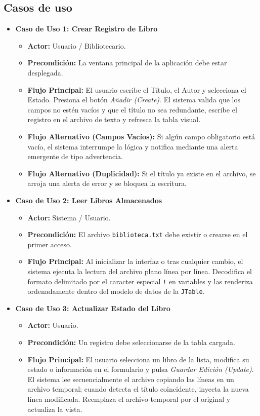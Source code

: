 \documentclass[a4paper]{article} %
\begin{document}
\subsection{Casos de uso}
\begin{itemize}
    \item \textbf{Caso de Uso 1: Crear Registro de Libro}
    \begin{itemize}
        \item \textbf{Actor:} Usuario / Bibliotecario.
        \item \textbf{Precondición:} La ventana principal de la aplicación debe estar desplegada.
        \item \textbf{Flujo Principal:} El usuario escribe el Título, el Autor y selecciona el Estado. Presiona el botón \textit{Añadir (Create)}. El sistema valida que los campos no estén vacíos y que el título no sea redundante, escribe el registro en el archivo de texto y refresca la tabla visual.
        \item \textbf{Flujo Alternativo (Campos Vacíos):} Si algún campo obligatorio está vacío, el sistema interrumpe la lógica y notifica mediante una alerta emergente de tipo advertencia.
        \item \textbf{Flujo Alternativo (Duplicidad):} Si el título ya existe en el archivo, se arroja una alerta de error y se bloquea la escritura.
    \end{itemize}
    
    \item \textbf{Caso de Uso 2: Leer Libros Almacenados}
    \begin{itemize}
        \item \textbf{Actor:} Sistema / Usuario.
        \item \textbf{Precondición:} El archivo \texttt{biblioteca.txt} debe existir o crearse en el primer acceso.
        \item \textbf{Flujo Principal:} Al inicializar la interfaz o tras cualquier cambio, el sistema ejecuta la lectura del archivo plano línea por línea. Decodifica el formato delimitado por el caracter especial \texttt{!} en variables y las renderiza ordenadamente dentro del modelo de datos de la \texttt{JTable}.
    \end{itemize}

    \item \textbf{Caso de Uso 3: Actualizar Estado del Libro}
    \begin{itemize}
        \item \textbf{Actor:} Usuario.
        \item \textbf{Precondición:} Un registro debe seleccionarse de la tabla cargada.
        \item \textbf{Flujo Principal:} El usuario selecciona un libro de la lista, modifica su estado o información en el formulario y pulsa \textit{Guardar Edición (Update)}. El sistema lee secuencialmente el archivo copiando las líneas en un archivo temporal; cuando detecta el título coincidente, inyecta la nueva línea modificada. Reemplaza el archivo temporal por el original y actualiza la vista.
    \end{itemize}


\end{itemize}
\end{document}
